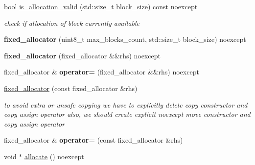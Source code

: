 \begin{CompactItemize}
bool \hyperlink{structhope_1_1memory_1_1final_44c5aa574f7dea1a3689fdb6e1215bf1}{is\_\-allocation\_\-valid} (std::size\_\-t block\_\-size) const noexcept
\begin{CompactList}\small\item\em check if allocation of block currently available \item\end{CompactList}\item 
\hypertarget{structhope_1_1memory_1_1final_ca1fedc5f4cb9a16cd668f09cf0c5233}{
\textbf{fixed\_\-allocator} (uint8\_\-t max\_\-blocks\_\-count, std::size\_\-t block\_\-size) noexcept}
\label{structhope_1_1memory_1_1final_ca1fedc5f4cb9a16cd668f09cf0c5233}

\item 
\hypertarget{structhope_1_1memory_1_1final_bc3b393955cb128645dddaaa2e3a7cce}{
\textbf{fixed\_\-allocator} (fixed\_\-allocator \&\&rhs) noexcept}
\label{structhope_1_1memory_1_1final_bc3b393955cb128645dddaaa2e3a7cce}

\item 
\hypertarget{structhope_1_1memory_1_1final_b36950f24b55764a6a628803d53163c3}{
fixed\_\-allocator \& \textbf{operator=} (fixed\_\-allocator \&\&rhs) noexcept}
\label{structhope_1_1memory_1_1final_b36950f24b55764a6a628803d53163c3}

\item 
\hyperlink{structhope_1_1memory_1_1final_3e02f1cf966f5447a579d51afa98330c}{fixed\_\-allocator} (const fixed\_\-allocator \&rhs)
\begin{CompactList}\small\item\em to avoid extra or unsafe copying we have to explicitly delete copy constructor and copy assign operator also, we should create explicit noexcept move constructor and copy assign operator \item\end{CompactList}\item 
\hypertarget{structhope_1_1memory_1_1final_ce713dd85f29313a87f24eae31a5a809}{
fixed\_\-allocator \& \textbf{operator=} (const fixed\_\-allocator \&rhs)}
\label{structhope_1_1memory_1_1final_ce713dd85f29313a87f24eae31a5a809}

\item 
\hypertarget{structhope_1_1memory_1_1final_517c29298f9b737bce38f335df100461}{
void $\ast$ \hyperlink{structhope_1_1memory_1_1final_517c29298f9b737bce38f335df100461}{allocate} () noexcept}
\label{structhope_1_1memory_1_1final_517c29298f9b737bce38f335df100461}


\end{CompactItemize}
